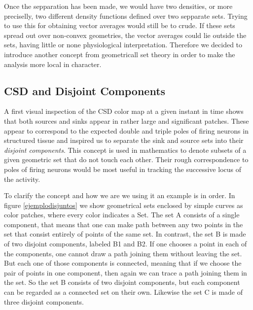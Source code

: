 \documentclass{article}
\begin{document}
Once the sepparation has been made, we would have two densities, or more preciselly, two different density functions defined over two sepparate sets. Trying to use this for obtaining vector averages would still be to crude. If these sets spread out over non-convex geometries, the vector averages could lie outside the sets, having little or none physiological interpretation. Therefore we decided to introduce another concept from geometricall set theory in order to make the analysis more local in character.



\subsection{CSD and Disjoint Components}


A first visual inspection of the CSD color map at a given instant in time shows that both sources and sinks appear in rather large and significant patches. These appear to correspond to the expected double and triple poles of firing neurons in structured tissue \cite{} and inspired us to separate the sink and source  sets into their \emph{disjoint components}. This concept is used in mathematics to denote subsets of a given geometric set that do not touch each other. Their rough correspondence to poles of firing neurons would be most useful in tracking the successive locus of the activity.


To clarify the concept and how we are we using it an example is in order. In figure \ref{ejemplodisjuntos} we show geometrical sets enclosed by simple curves as color patches, where every color indicates a Set. The set A consists of a single component, that means that one can make  path between any two points in the set that consist entirely of points of the same set. In contrast, the set B is made of two disjoint components, labeled B1 and B2. If one chooses a point in each of the components, one cannot draw a path joining them without leaving the set. But each one of those components is connected, meaning that if we choose the pair of points in one component, then again we can trace a path joining them in the set. So the set B consists of two disjoint components, but each component can be regarded as a connected set on their own. Likewise the set C is made of three disjoint components. 
 
\end{document}

